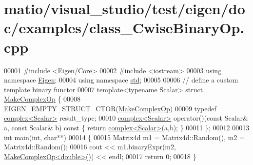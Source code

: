 \hypertarget{matio_2visual__studio_2test_2eigen_2doc_2examples_2class___cwise_binary_op_8cpp_source}{}\section{matio/visual\+\_\+studio/test/eigen/doc/examples/class\+\_\+\+Cwise\+Binary\+Op.cpp}
\label{matio_2visual__studio_2test_2eigen_2doc_2examples_2class___cwise_binary_op_8cpp_source}

\begin{DoxyCode}
00001 \textcolor{preprocessor}{#include <Eigen/Core>}
00002 \textcolor{preprocessor}{#include <iostream>}
00003 \textcolor{keyword}{using namespace }\hyperlink{namespace_eigen}{Eigen};
00004 \textcolor{keyword}{using namespace }\hyperlink{namespacestd}{std};
00005 
00006 \textcolor{comment}{// define a custom template binary functor}
00007 \textcolor{keyword}{template}<\textcolor{keyword}{typename} Scalar> \textcolor{keyword}{struct }\hyperlink{struct_make_complex_op}{MakeComplexOp} \{
00008   EIGEN\_EMPTY\_STRUCT\_CTOR(\hyperlink{struct_make_complex_op}{MakeComplexOp})
00009   \textcolor{keyword}{typedef} \hyperlink{structcomplex}{complex<Scalar>} result\_type;
00010   \hyperlink{structcomplex}{complex<Scalar>} operator()(\textcolor{keyword}{const} Scalar& a, \textcolor{keyword}{const} Scalar& b)\textcolor{keyword}{ const }\{ \textcolor{keywordflow}{return} 
      \hyperlink{structcomplex}{complex<Scalar>}(a,b); \}
00011 \};
00012 
00013 \textcolor{keywordtype}{int} main(\textcolor{keywordtype}{int}, \textcolor{keywordtype}{char}**)
00014 \{
00015   Matrix4d m1 = Matrix4d::Random(), m2 = Matrix4d::Random();
00016   cout << m1.binaryExpr(m2, \hyperlink{struct_make_complex_op}{MakeComplexOp<double>}()) << endl;
00017   \textcolor{keywordflow}{return} 0;
00018 \}
\end{DoxyCode}
